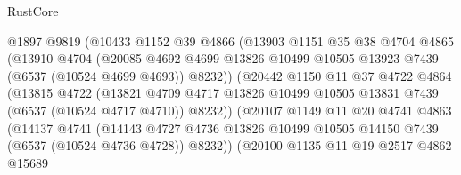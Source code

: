 \begin{lexlean}{RustCore}
\begin{coremodule}
                        @1897
                        @9819
                        (@10433
                          @1152
                          @39
                          @4866
                          (@13903
                            @1151
                            @35
                            @38
                            @4704
                            @4865
                            (@13910
                              @4704
                              (@20085
                                @4692
                                @4699
                                @13826
                                @10499
                                @10505
                                @13923
                                @7439
                                (@6537 (@10524 @4699 @4693))
                                @8232))
                            (@20442
                              @1150
                              @11
                              @37
                              @4722
                              @4864
                              (@13815
                                @4722
                                (@13821
                                  @4709
                                  @4717
                                  @13826
                                  @10499
                                  @10505
                                  @13831
                                  @7439
                                  (@6537 (@10524 @4717 @4710))
                                  @8232))
                              (@20107
                                @1149
                                @11
                                @20
                                @4741
                                @4863
                                (@14137
                                  @4741
                                  (@14143
                                    @4727
                                    @4736
                                    @13826
                                    @10499
                                    @10505
                                    @14150
                                    @7439
                                    (@6537 (@10524 @4736 @4728))
                                    @8232))
                                (@20100
                                  @1135
                                  @11
                                  @19
                                  @2517
                                  @4862
                                  @15689

\end{coremodule}
\end{lexlean}
